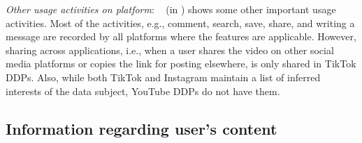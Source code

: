 \noindent
\textit{Other usage activities on platform}: 
~ (in ) shows some other important usage activities.
Most of the activities, e.g., comment, search, save, share, and writing a message are recorded by all platforms where the features are applicable.
However, sharing across applications, i.e., when a user shares the video on other social media platforms or copies the link for posting elsewhere, is only shared in TikTok DDPs.
Also, while both TikTok and Instagram maintain a list of inferred interests of the data subject, YouTube DDPs do not have them. %



\subsection{Information regarding user's content}
\label{Sec: Content}

